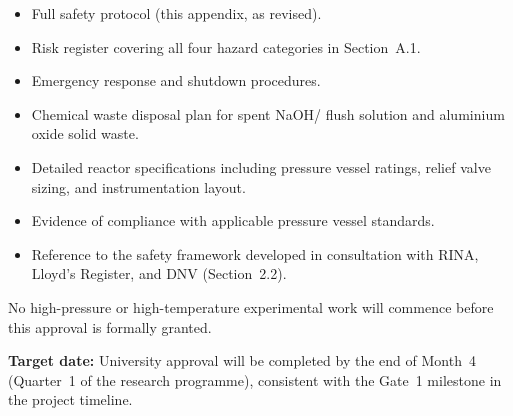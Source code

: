 \documentclass[12pt]{article}
\begin{document}
\begin{itemize}[itemsep=3pt]
    \item Full safety protocol (this appendix, as revised).
    \item Risk register covering all four hazard categories in Section~A.1.
    \item Emergency response and shutdown procedures.
    \item Chemical waste disposal plan for spent NaOH/ flush solution
          and aluminium oxide solid waste.
    \item Detailed reactor specifications including pressure vessel ratings, relief
          valve sizing, and instrumentation layout.
    \item Evidence of compliance with applicable pressure vessel standards.
    \item Reference to the safety framework developed in consultation with RINA,
          Lloyd's Register, and DNV (Section~2.2).
\end{itemize}

\medskip
\begin{tcolorbox}[
    colback=red!6,
    colframe=red!60!black,
    title={\textbf{Hard Stop}},
    fonttitle=\bfseries
]
No high-pressure or high-temperature experimental work will commence before this
approval is formally granted.
\end{tcolorbox}

\medskip
\noindent\textbf{Target date:} University approval will be completed by the end of
Month~4 (Quarter~1 of the research programme), consistent with the Gate~1 milestone
in the project timeline.
\end{document}
